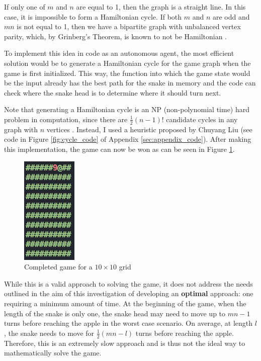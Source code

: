 \documentclass[12pt]{article}
\begin{document}
If only one of $m$ and $n$ are equal to 1, then the graph is a straight line. In this case, it is impossible to form a Hamiltonian cycle. If both $m$ and $n$ are odd and $mn$ is not equal to 1, then we have a bipartite graph with unbalanced vertex parity, which, by Grinberg's Theorem, is known to not be Hamiltonian \cite{zagaran2018}.

To implement this idea in code as an autonomous agent, the most efficient solution would be to generate a Hamiltonian cycle for the game graph when the game is first initialized. This way, the function into which the game state would be the input already has the best path for the snake in memory and the code can check where the snake head is to determine where it should turn next.

Note that generating a Hamiltonian cycle is an NP (non-polynomial time) hard problem in computation, since there are $\frac{1}{2} (n-1)!$ candidate cycles in any graph with $n$ vertices \cite{mitchell2019}. Instead, I used a heuristic proposed by Chuyang Liu \cite{liu2019} (see code in Figure \ref{fig:cycle_code} of Appendix \ref{sec:appendix_code}). After making this implementation, the game can now be won as can be seen in Figure \ref{fig:finished_cycle}.

\begin{figure}[!h]
\centering
	\includegraphics[scale=0.6]{finished_cycle.png}
	\caption{Completed game for a $10 \times 10$ grid}
	\label{fig:finished_cycle}
\end{figure}

While this is a valid approach to solving the game, it does not address the needs outlined in the aim of this investigation of developing an \textbf{optimal} approach: one requiring a minimum amount of time. At the beginning of the game, when the length of the snake is only one, the snake head may need to move up to $mn - 1$ turns before reaching the apple in the worst case scenario. On average, at length $l$, the snake needs to move for $\frac{1}{2} (mn-l)$ turns before reaching the apple. Therefore, this is an extremely slow approach and is thus not the ideal way to mathematically solve the game.
\end{document}
